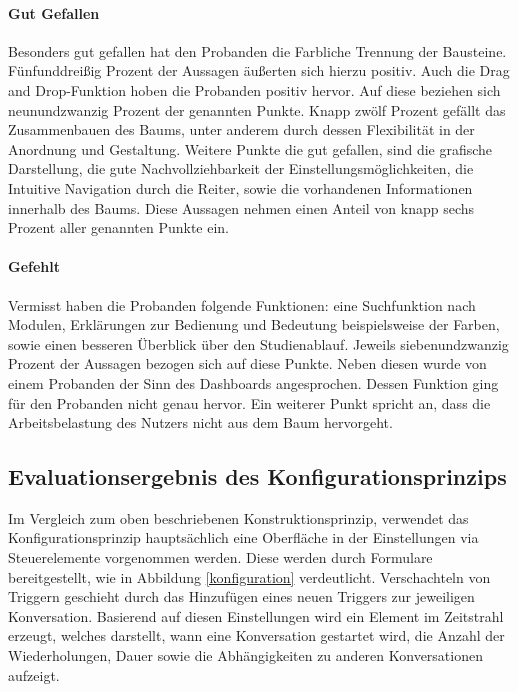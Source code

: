 \paragraph{Gut Gefallen}Besonders gut gefallen hat den Probanden die Farbliche Trennung der Bausteine.  Fünfunddreißig Prozent der Aussagen äußerten sich hierzu positiv. Auch die Drag and Drop-Funktion hoben die Probanden positiv hervor. Auf diese beziehen sich neunundzwanzig Prozent der genannten Punkte. Knapp zwölf Prozent gefällt das Zusammenbauen des Baums, unter anderem durch dessen Flexibilität in der Anordnung und Gestaltung. Weitere Punkte die gut gefallen, sind die grafische Darstellung, die gute Nachvollziehbarkeit der Einstellungsmöglichkeiten, die Intuitive Navigation durch die Reiter, sowie die vorhandenen Informationen innerhalb des Baums. Diese Aussagen nehmen einen Anteil von knapp sechs Prozent aller genannten Punkte ein.

\paragraph{Gefehlt}Vermisst haben die Probanden folgende Funktionen: eine Suchfunktion nach Modulen, Erklärungen zur Bedienung und Bedeutung beispielsweise der Farben, sowie einen besseren Überblick über den Studienablauf. Jeweils siebenundzwanzig Prozent der Aussagen bezogen sich auf diese Punkte. Neben diesen wurde von einem Probanden der Sinn des Dashboards angesprochen. Dessen Funktion ging für den Probanden nicht genau hervor. Ein weiterer Punkt spricht an, dass die Arbeitsbelastung des Nutzers nicht aus dem Baum hervorgeht.



\subsection{Evaluationsergebnis des Konfigurationsprinzips}
Im Vergleich zum oben beschriebenen Konstruktionsprinzip, verwendet das Konfigurationsprinzip hauptsächlich eine Oberfläche in der Einstellungen via Steuerelemente vorgenommen werden. Diese werden durch Formulare bereitgestellt, wie in Abbildung \ref{konfiguration} verdeutlicht. Verschachteln von Triggern geschieht durch das Hinzufügen eines neuen Triggers zur jeweiligen Konversation. Basierend auf diesen Einstellungen wird ein Element im Zeitstrahl erzeugt, welches darstellt, wann eine Konversation gestartet wird, die Anzahl der Wiederholungen, Dauer sowie die Abhängigkeiten zu anderen Konversationen aufzeigt. 

